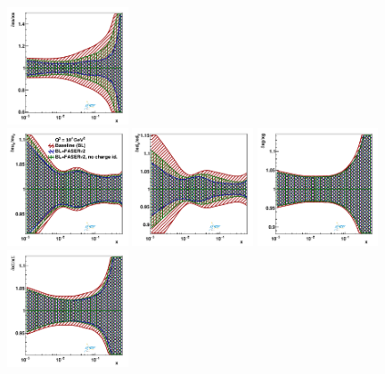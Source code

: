 \begin{figure}[htbp]
	\includegraphics[width=0.32\textwidth]{plots/nuclear_fasernu2/inclusive-only_vs_inclusive+charm/statOnly_FASERv2_q2_10000_pdf_s_ratio.pdf}\\
	\includegraphics[width=0.32\textwidth]{plots/nuclear_fasernu2/nochargediscrimination/statOnly_FASERv2_q2_10000_pdf_uv_ratio.pdf}
	\includegraphics[width=0.32\textwidth]{plots/nuclear_fasernu2/nochargediscrimination/statOnly_FASERv2_q2_10000_pdf_dv_ratio.pdf}
	\includegraphics[width=0.32\textwidth]{plots/nuclear_fasernu2/nochargediscrimination/statOnly_FASERv2_q2_10000_pdf_g_ratio.pdf}\\
	\includegraphics[width=0.32\textwidth]{plots/nuclear_fasernu2/nochargediscrimination/statOnly_FASERv2_q2_10000_pdf_Sea_ratio.pdf}

\end{figure}
